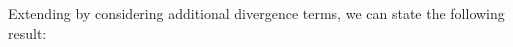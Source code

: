 \documentclass[11pt,reqno]{amsart}%
\newtheorem{lemma}[theorem]{Lemma}
\numberwithin{equation}{section}
\begin{document}
{Extending \cite[Lemma 3.1]{Andrei_AMO} by considering additional divergence terms, we can state the following result:
% 
% 
}
\end{document}

